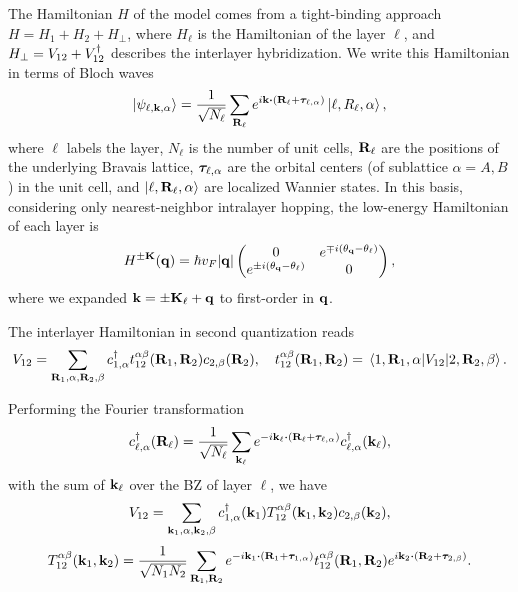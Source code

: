 \documentclass[12pt]{report}
\begin{document}
\n

The Hamiltonian $H$ of the model comes from a tight-binding approach $H = H_1 + H_2 + H_{\perp}$, where $H_\ell$ is the Hamiltonian of the layer $\ell$, and $H_\perp = V_{12} + V_{12}^\dagger$ describes the interlayer hybridization. We write this Hamiltonian in terms of Bloch waves
\begin{equation} \label{eq:BM-blochwave}
\ket{\psi_{\ell, \k, \alpha}} = \frac{1}{\sqrt{N_\ell}} \sum_{\R_\ell} e^{i \k \vdot (\R_\ell + \vtau_{\ell,\alpha})} \ket{\ell, R_\ell, \alpha},
\end{equation}
where $\ell$ labels the layer, $N_\ell$ is the number of unit cells, $\vb{R}_\ell$ are the positions of the underlying Bravais lattice, ${\bm{\tau}}_{\ell,\alpha}$ are the orbital centers (of sublattice $\alpha = A,B$) in the unit cell, and $\ket{\ell,\vb{R}_\ell,\alpha}$ are localized Wannier states. In this basis, considering only nearest-neighbor intralayer hopping, the low-energy Hamiltonian of each layer is
\begin{equation} \label{eq:blg-eachlayer-hamil-lowenergy}
H^{\pm \vb{K}}({\vb{q}}) = \hbar v_F \abs{{\vb{q}}}
\begin{pmatrix}
0 & e^{\mp i (\theta_{\vb{q}} - \theta_\ell)} \\
e^{\pm i (\theta_{\vb{q}} - \theta_\ell)} & 0
\end{pmatrix},
\end{equation}
where we expanded ${\vb{k}} = \pm \vb{K}_\ell + {\vb{q}}$ to first-order in ${\vb{q}}$.

\n

The interlayer Hamiltonian in second quantization reads
\begin{equation} \label{eq:interlayer-hopping}
V_{12} = \sum_{\vb{R}_1,\alpha,\vb{R}_2,\beta} c_{1,\alpha}^\dagger t_{12}^{\alpha\beta}(\vb{R}_1,\vb{R}_2) c_{2,\beta}(\vb{R}_2), \quad
t_{12}^{\alpha\beta}(\vb{R}_1,\vb{R}_2) =
\mel{1,\vb{R}_1,\alpha}{V_{12}}{2,\vb{R}_2,\beta}.
\end{equation}

Performing the Fourier transformation
\begin{equation} \label{eq:blg-fourier}
c_{\ell,\alpha}^\d(\R_\ell) = \frac{1}{\sqrt{N_\ell}} \sum_{\k_\ell}
e^{-i\k_\ell \vdot (\R_\ell + \vtau_{\ell,\alpha})} c_{\ell,\alpha}^\d(\k_\ell),
\end{equation}
with the sum of ${\vb{k}}_\ell$ over the BZ of layer $\ell$, we have
\begin{equation} \label{eq:interlayer-hopping-kspace}
V_{12} = \sum_{{\vb{k}}_1,\alpha,{\vb{k}}_2,\beta} c_{1,\alpha}^\dagger({\vb{k}}_1) T_{12}^{\alpha\beta}({\vb{k}}_1,{\vb{k}}_2) c_{2,\beta}({\vb{k}}_2),
\end{equation}
\begin{equation} \label{eq:interlayer-hopping-Tkspace}
T_{12}^{\alpha\beta}(\k_1,\k_2) =
\frac{1}{\sqrt{N_1 N_2}} \sum_{\R_1,\R_2} e^{-i\k_1\vdot(\R_1+\vtau_{1,\alpha})}
t_{12}^{\alpha\beta}(\R_1,\R_2) e^{i\k_2\vdot(\R_2+\vtau_{2,\beta})}.
\end{equation}
\end{document}
